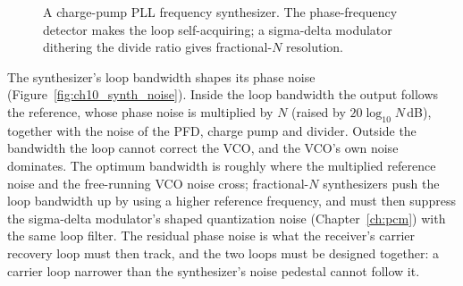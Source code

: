 \begin{figure}[htbp]\centering
{}
\caption{A charge-pump PLL frequency synthesizer. The phase-frequency detector makes the loop
self-acquiring; a sigma-delta modulator dithering the divide ratio gives fractional-$N$ resolution.}
\label{fig:ch10_cppll}
\end{figure}

The synthesizer's loop bandwidth shapes its phase noise (Figure~\ref{fig:ch10_synth_noise}).
Inside the loop bandwidth the output follows the reference, whose phase noise is multiplied by $N$
(raised by $20\log_{10}N$\,dB), together with the noise of the PFD, charge pump and divider. Outside
the bandwidth the loop cannot correct the VCO, and the VCO's own noise dominates. The optimum
bandwidth is roughly where the multiplied reference noise and the free-running VCO noise cross;
fractional-$N$ synthesizers push the loop bandwidth up by using a higher reference frequency, and
must then suppress the sigma-delta modulator's shaped quantization noise (Chapter~\ref{ch:pcm}) with
the same loop filter. The residual phase noise is what the receiver's carrier recovery loop must
then track, and the two loops must be designed together: a carrier loop narrower than the
synthesizer's noise pedestal cannot follow it.


